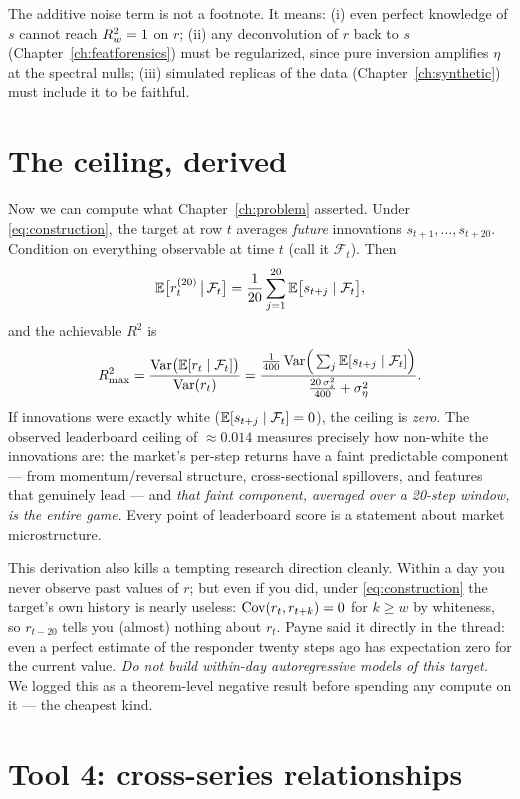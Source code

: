 The additive noise term is not a footnote. It means: (i) even perfect
knowledge of $s$ cannot reach $R^2_{w} = 1$ on $r$; (ii) any deconvolution of
$r$ back to $s$ (Chapter~\ref{ch:featforensics}) must be regularized, since
pure inversion amplifies $\eta$ at the spectral nulls; (iii) simulated
replicas of the data (Chapter~\ref{ch:synthetic}) must include it to be
faithful.

\section{The ceiling, derived}
\label{sec:ceilingderiv}

Now we can compute what Chapter~\ref{ch:problem} asserted. Under
\eqref{eq:construction}, the target at row $t$ averages \emph{future}
innovations $s_{t+1},\dots,s_{t+20}$. Condition on everything observable at
time $t$ (call it $\mathcal F_t$). Then
\[
\mathbb{E}\big[r^{(20)}_t \,\big|\, \mathcal F_t\big]
= \frac{1}{20}\sum_{j=1}^{20} \mathbb{E}\big[s_{t+j} \mid \mathcal F_t\big],
\]
and the achievable $R^2$ is
\[
R^2_{\max}
= \frac{\operatorname{Var}\!\big(\mathbb{E}[r_t \mid \mathcal F_t]\big)}{\operatorname{Var}(r_t)}
= \frac{\frac{1}{400}\operatorname{Var}\!\Big(\sum_j \mathbb{E}[s_{t+j}\mid\mathcal F_t]\Big)}
       {\frac{20\,\sigma_s^2}{400} + \sigma_\eta^2}.
\]
If innovations were exactly white ($\mathbb{E}[s_{t+j}\mid\mathcal F_t]=0$), the
ceiling is \emph{zero}. The observed leaderboard ceiling of $\approx 0.014$
measures precisely how non-white the innovations are: the market's per-step
returns have a faint predictable component --- from momentum/reversal
structure, cross-sectional spillovers, and features that genuinely lead ---
and \emph{that faint component, averaged over a 20-step window, is the
entire game}. Every point of leaderboard score is a statement about market
microstructure.

This derivation also kills a tempting research direction cleanly. Within a
day you never observe past values of $r$; but even if you did, under
\eqref{eq:construction} the target's own history is nearly useless:
$\operatorname{Cov}(r_t, r_{t+k}) = 0$ for $k \geq w$ by whiteness, so
$r_{t-20}$ tells you (almost) nothing about $r_t$. Payne said it directly
in the thread: even a perfect estimate of the responder twenty steps ago
has expectation zero for the current value. \emph{Do not build within-day
autoregressive models of this target.} We logged this as a
theorem-level negative result before spending any compute on it --- the
cheapest kind.

\section{Tool 4: cross-series relationships}


